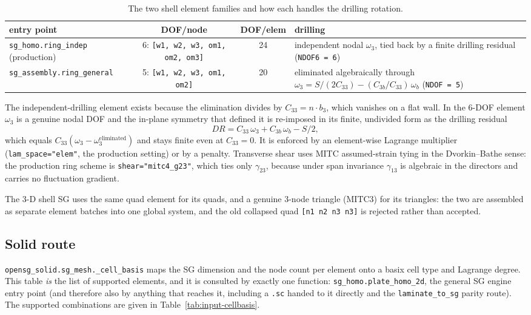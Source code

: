 \begin{table}[htbp]
\centering
\small
\caption{The two shell element families and how each handles the drilling
rotation.}
\label{tab:input-shell-elements}
\begin{tabular}{@{}lccp{5.6cm}@{}}
\toprule
entry point & DOF/node & DOF/elem & drilling \\
\midrule
\texttt{sg\_homo.ring\_indep} (production)
  & 6: \texttt{[w1, w2, w3, om1, om2, om3]} & 24
  & independent nodal $\omega_3$, tied back by a finite drilling residual
    (\texttt{NDOF6 = 6}) \\
\texttt{sg\_assembly.ring\_general}
  & 5: \texttt{[w1, w2, w3, om1, om2]} & 20
  & eliminated algebraically through
    $\omega_3 = S/(2C_{33}) - (C_{3b}/C_{33})\,\omega_b$ (\texttt{NDOF = 5}) \\
\bottomrule
\end{tabular}
\end{table}

The independent-drilling element exists because the elimination divides by
$C_{33} = n \cdot b_3$, which vanishes on a flat wall. In the 6-DOF element
$\omega_3$ is a genuine nodal DOF and the in-plane symmetry that defined it is
re-imposed in its finite, undivided form as the drilling residual
\[
DR = C_{33}\,\omega_3 + C_{3b}\,\omega_b - S/2 ,
\]
which equals $C_{33}(\omega_3 - \omega_3^{\text{eliminated}})$ and stays finite
even at $C_{33} = 0$. It is enforced by an element-wise Lagrange multiplier
(\texttt{lam\_space="elem"}, the production setting) or by a penalty. Transverse
shear uses MITC assumed-strain tying in the Dvorkin--Bathe sense: the production
ring scheme is \texttt{shear="mitc4\_g23"}, which ties only $\gamma_{23}$,
because under span invariance $\gamma_{13}$ is algebraic in the directors and
carries no fluctuation gradient.

The 3-D shell SG uses the same quad element for its quads, and a genuine
3-node triangle (MITC3) for its triangles: the two are assembled as separate
element batches into one global system, and the old collapsed quad
\texttt{[n1 n2 n3 n3]} is rejected rather than accepted.

\subsection{Solid route}

\texttt{opensg\_solid.sg\_mesh.\_cell\_basis} maps the SG dimension and the node
count per element onto a basix cell type and Lagrange degree. This table
\emph{is} the list of supported elements, and it is consulted by exactly one
function: \texttt{sg\_homo.plate\_homo\_2d}, the general SG engine entry point
(and therefore also by anything that reaches it, including a \texttt{.sc} handed
to it directly and the \texttt{laminate\_to\_sg} parity route). The supported
combinations are given in Table~\ref{tab:input-cellbasis}.

